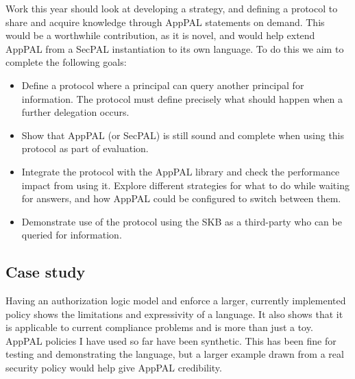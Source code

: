 \documentclass[a4paper]{scrartcl}
\begin{document}
Work this year should look at developing a strategy, and defining a protocol to share and acquire knowledge through AppPAL statements on demand.
This would be a worthwhile contribution, as it is novel, and would help extend AppPAL from a SecPAL instantiation to its own language.
To do this we aim to complete the following goals:
\begin{itemize}
  \item
    Define a protocol where a principal can query another principal for information.
    The protocol must define precisely what should happen when a further delegation occurs.
  \item
    Show that AppPAL (or SecPAL) is still sound and complete when using this protocol as part of evaluation.
  \item
    Integrate the protocol with the AppPAL library and check the performance impact from using it.
    Explore different strategies for what to do while waiting for answers, and how AppPAL could be configured to switch between them.
  \item
    Demonstrate use of the protocol using the \ac{SKB} as a third-party who can be queried for information.
\end{itemize}

\subsection{Case study}

Having an authorization logic model and enforce a larger, currently implemented policy shows the limitations and expressivity of a language.
It also shows that it is applicable to current compliance problems and is more than just a toy.
AppPAL policies I have used so far have been synthetic.
This has been fine for testing and demonstrating the language, but a larger example drawn from a real security policy would help give AppPAL credibility.
\end{document}
